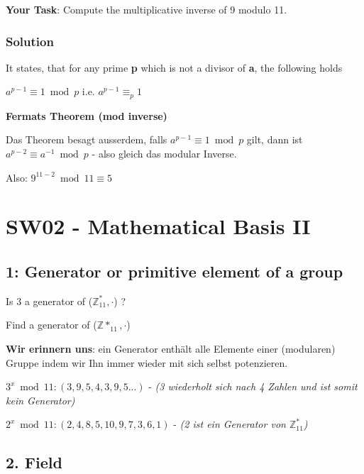 \documentclass[11pt]{article}
\begin{document}
\textbf{Your Task}: Compute the multiplicative inverse of 9 modulo 11.

\hypertarget{solution}{%
\subsubsection{Solution}\label{solution}}

It states, that for any prime \textbf{p} which is not a divisor of
\textbf{a}, the following holds

\(a^{p-1} \equiv 1 \bmod p\) i.e. \(a^{p-1} \equiv_{p} 1\)

\textbf{Fermats Theorem (mod inverse)}

Das Theorem besagt ausserdem, falls \(a^{p-1} \equiv 1 \bmod p\) gilt,
dann ist \(a^{p-2} \equiv a^{-1} \bmod p\) - also gleich das modular
Inverse.

Also: \(9^{11-2} \bmod 11 \equiv 5\)

    

    \hypertarget{sw02---mathematical-basis-ii}{%
\section{SW02 - Mathematical Basis
II}\label{sw02---mathematical-basis-ii}}

    \hypertarget{generator-or-primitive-element-of-a-group}{%
\subsection{1: Generator or primitive element of a
group}\label{generator-or-primitive-element-of-a-group}}

Is 3 a generator of (\(\mathbb{Z}^{*}_{11}, \cdot\)) ?

Find a generator of (\(\mathbb{Z}*_{11}, \cdot\))

\textbf{Wir erinnern uns}: ein Generator enthält alle Elemente einer
(modularen) Gruppe indem wir Ihn immer wieder mit sich selbst
potenzieren.

\(3^{x} \bmod 11 : (3, 9, 5, 4, 3, 9, 5...)\) - \emph{(3 wiederholt sich
nach 4 Zahlen und ist somit kein Generator)}

\(2^{x} \bmod 11 : (2, 4, 8, 5, 10, 9, 7, 3, 6, 1)\) - \emph{(2 ist ein
Generator von \(\mathbb{Z}^{*}_{11}\))}

    \hypertarget{field}{%
\subsection{2. Field}\label{field}}
\end{document}
